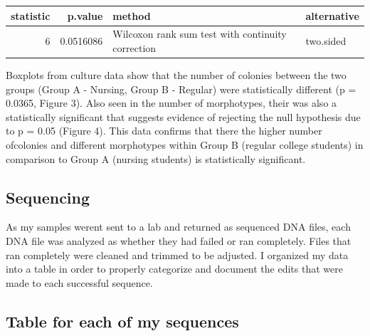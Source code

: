 \documentclass[]{article}
\begin{document}
\begin{longtable}[]{@{}rrll@{}}
\toprule
statistic & p.value & method & alternative\tabularnewline
\midrule
\endhead
6 & 0.0516086 & Wilcoxon rank sum test with continuity correction &
two.sided\tabularnewline
\bottomrule
\end{longtable}

Boxplots from culture data show that the number of colonies between the
two groups (Group A - Nursing, Group B - Regular) were statistically
different (p = 0.0365, Figure 3). Also seen in the number of
morphotypes, their was also a statistically significant that suggests
evidence of rejecting the null hypothesis due to p = 0.05 (Figure 4).
This data confirms that there the higher number ofcolonies and different
morphotypes within Group B (regular college students) in comparison to
Group A (nursing students) is statistically significant.

\hypertarget{sequencing}{%
\subsection{Sequencing}\label{sequencing}}

As my samples werent sent to a lab and returned as sequenced DNA files,
each DNA file was analyzed as whether they had failed or ran completely.
Files that ran completely were cleaned and trimmed to be adjusted. I
organized my data into a table in order to properly categorize and
document the edits that were made to each successful sequence.

\hypertarget{table-for-each-of-my-sequences}{%
\subsection{Table for each of my
sequences}\label{table-for-each-of-my-sequences}}
\end{document}
